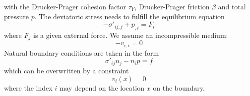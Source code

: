 with the Drucker-Prager cohesion factor
$\tau_{Y}$, Drucker-Prager friction $\beta$ and total pressure $p$.
The deviatoric stress needs to fulfill the equilibrium equation
\begin{equation}\label{IKM-EQU-1}
-\sigma'_{ij,j}+p_{,i}=F_{i}
\end{equation}
where $F_{j}$ is a given external force. We assume an incompressible medium:
\begin{equation}\label{IKM-EQU-2bbb}
-v_{i,i}=0
\end{equation}
Natural boundary conditions are taken in the form
\begin{equation}\label{IKM-EQU-Boundary}
\sigma'_{ij}n_{j}-n_{i}p=f
\end{equation}
which can be overwritten by a constraint
\begin{equation}\label{IKM-EQU-Boundary0}
v_{i}(x)=0
\end{equation}
where the index $i$ may depend on the location $x$ on the boundary.

